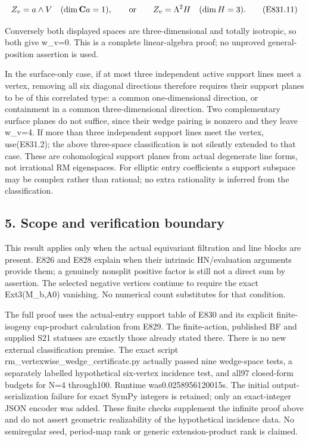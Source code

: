 \[
 Z_v=a\wedge V\quad(\dim\mathbf Ca=1),
 \qquad\hbox{or}\qquad
 Z_v=\Lambda^2H\quad(\dim H=3).
 \tag{E831.11}
\]

Conversely both displayed spaces are three-dimensional and totally
isotropic, so both give w\_v=0. This is a complete linear-algebra proof; no
unproved general-position assertion is used.

In the surface-only case, if at most three independent active support lines
meet a vertex, removing all six diagonal directions therefore requires their
support planes to be of this correlated type: a common one-dimensional
direction, or containment in a common three-dimensional direction. Two
complementary surface planes do not suffice, since their wedge pairing is
nonzero and they leave w\_v=4. If more than three independent support lines
meet the vertex, use(E831.2); the above three-space classification is not
silently extended to that case. These are cohomological support planes from
actual degenerate line forms, not irrational RM eigenspaces. For elliptic
entry coefficients a support subspace may be complex rather than rational;
no extra rationality is inferred from the classification.

\subsection{5. Scope and verification
boundary}\label{SF-E831:scope-and-verification-boundary}

This result applies only when the actual equivariant filtration and line
blocks are present. E826 and E828 explain when their intrinsic HN/evaluation
arguments provide them; a genuinely nonsplit positive factor is still not a
direct sum by assertion. The selected negative vertices continue to require
the exact Ext3(M\_b,A0) vanishing. No numerical count substitutes for that
condition.

The full proof uses the actual-entry support table of E830 and its explicit
finite-isogeny cup-product calculation from E829. The finite-action,
published BF and supplied S21 statuses are exactly those already stated
there. There is no new external classification premise. The exact script
rm\_vertexwise\_wedge\_certificate.py actually passed nine wedge-space
tests, a separately labelled hypothetical six-vertex incidence test, and
all97 closed-form budgets for N=4 through100. Runtime was0.0258956120015s.
The initial output-serialization failure for exact SymPy integers is
retained; only an exact-integer JSON encoder was added. These finite checks
supplement the infinite proof above and do not assert geometric
realizability of the hypothetical incidence data. No semiregular seed,
period-map rank or generic extension-product rank is claimed.
